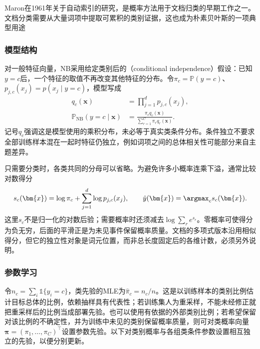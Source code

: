 Maron在1961年关于自动索引的研究，是概率方法用于文档归类的早期工作之一。文档分类需要从大量词项中提取可累积的类别证据，这也成为朴素贝叶斯的一项典型用途

\subsubsection{模型结构}
\label{sec:classification-naive-bayes-structure}

对一般特征向量，NB采用给定类别后的（conditional independence）假设：已知$y=c$后，一个特征的取值不再改变其他特征的分布。令$\pi_c=\mathbb{P}(y=c)$、$p_{j,c}(x_j)=p(x_j\mid y=c)$，模型写成
\begin{equation}
  \label{eq:classification-naive-bayes-model}
  \begin{aligned}
    q_c(\bm{x})&=\prod_{j=1}^{d}p_{j,c}(x_j),\\
    \mathbb{P}_{\mathrm{NB}}(y=c\mid\bm{x})
      &=\frac{\pi_c q_c(\bm{x})}
      {\sum_{r=1}^{C}\pi_r q_r(\bm{x})}.
  \end{aligned}
\end{equation}
记号$q_c$强调这是模型使用的乘积分布，未必等于真实类条件分布。条件独立不要求全部训练样本混在一起时特征仍独立，例如词项之间的总体相关性可能部分来自主题差异。

只需要分类时，各类共同的分母可以省略。为避免许多小概率连乘下溢，通常比较对数得分
\begin{equation}
  \label{eq:classification-naive-bayes-score}
  s_c(\bm{x})
  =\log\pi_c+\sum_{j=1}^{d}\log p_{j,c}(x_j),
  \qquad
  \hat y(\bm{x})=\argmax_c s_c(\bm{x}).
\end{equation}
这里$s_c$不是归一化的对数后验；需要概率时还须减去$\log\sum_r e^{s_r}$。零概率可使得分为负无穷，后面的平滑正是为未见事件保留概率质量。文档的多项式版本沿用相似得分，但它的独立性对象是词元位置，而非总长度固定后的各维计数，必须另外说明。

\subsubsection{参数学习}
\label{sec:classification-naive-bayes-learning}

令$n_c=\sum_i\mathbb{1}\{y_i=c\}$，类先验的MLE为$\hat\pi_c=n_c/n$。这是以训练样本的类别比例估计目标总体的比例，依赖抽样具有代表性；若训练集人为重采样，不能未经修正就把重采样后的比例当成部署先验。也可以使用有依据的外部类别比例；若希望保留对该比例的不确定性，并为训练中未见的类别保留概率质量，则可对类概率向量$\bm{\pi}=(\pi_1,\ldots,\pi_C)^{\top}$设置参数先验。以下对类别概率与各组类条件参数设置相互独立的先验，以便分别更新。

